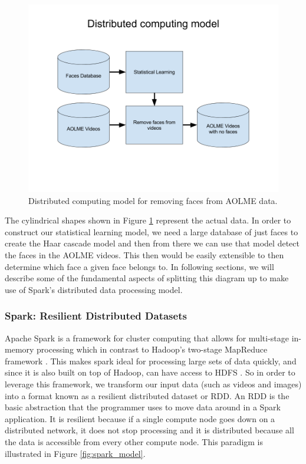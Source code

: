 \documentclass[
	submission,
	final,
	notitlepage,
	narroweqnarray,
	inline,
	twoside,
	]{ieee}
\begin{document}
\begin{figure}[h]
\centering
\includegraphics[width=\linewidth]{figures/face_detection_block_diagram}
\caption{Distributed computing model for removing faces from AOLME data.}
\label{fig:distributed_computing_model}
\end{figure}

\FloatBarrier

The cylindrical shapes shown in Figure \ref{fig:distributed_computing_model}
represent the actual data. In order to construct our statistical learning model,
we need a large database of just faces to create the Haar cascade model
and then from there we can use that model detect the faces in the AOLME
videos. This then would be easily extensible to then determine
which face a given face belongs to. In following sections, we will describe some of the
fundamental aspects of splitting this diagram up to make use of Spark's
distributed data processing model.

\subsubsection{Spark: Resilient Distributed Datasets}
Apache Spark is a framework for cluster computing that allows for multi-stage
in-memory processing which in contrast to Hadoop's two-stage MapReduce
framework \cite{spark} \cite{hadoop}. This makes spark ideal for
processing large sets of data quickly, and since it is also built
on top of Hadoop, can have access to HDFS \cite{spark}. So in order
to leverage this framework, we transform our input data (such as videos
and images) into a format known as a resilient distributed dataset
or RDD. An RDD is the basic abstraction that the programmer uses
to move data around in a Spark application. It is resilient because
if a single compute node goes down on a distributed network, it does
not stop processing and it is distributed because all the data is
accessible from every other compute node. This paradigm is illustrated
in Figure \ref{fig:spark_model}.
\end{document}

